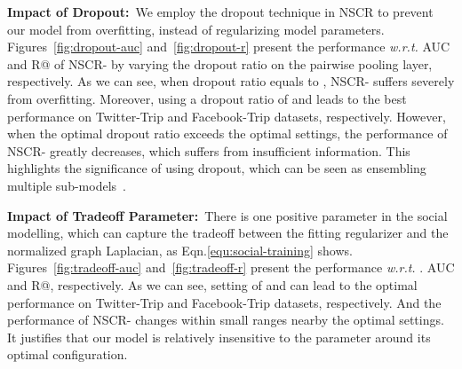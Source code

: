 \documentclass[sigconf]{acmart}
\newcommand{\wrt}{\emph{w.r.t. }}
\begin{document}
	\textbf{Impact of Dropout:}~We employ the dropout technique in NSCR to prevent our model from overfitting, instead of regularizing model parameters. Figures~\ref{fig:dropout-auc} and~\ref{fig:dropout-r} present the performance \wrt AUC and R@ of NSCR- by varying the dropout ratio  on the pairwise pooling layer, respectively. As we can see, when dropout ratio equals to , NSCR- suffers severely from overfitting. Moreover, using a dropout ratio of  and  leads to the best performance on Twitter-Trip and Facebook-Trip datasets, respectively. However, when the optimal dropout ratio exceeds the optimal settings, the performance of NSCR- greatly decreases, which suffers from insufficient information. This highlights the significance of using dropout, which can be seen as ensembling multiple sub-models~\cite{DBLP:journals/jmlr/SrivastavaHKSS14}.
	
	\textbf{Impact of Tradeoff Parameter:}~There is one positive parameter  in the social modelling, which can capture the tradeoff between the fitting regularizer and the normalized graph Laplacian, as Eqn.\eqref{equ:social-training} shows. Figures~\ref{fig:tradeoff-auc} and~\ref{fig:tradeoff-r} present the performance \wrt. AUC and R@, respectively. As we can see, setting  of  and  can lead to the optimal performance on Twitter-Trip and Facebook-Trip datasets, respectively. And the performance of NSCR- changes within small ranges nearby the optimal settings. It justifies that our model is relatively insensitive to the parameter around its optimal configuration.
	
\end{document}
